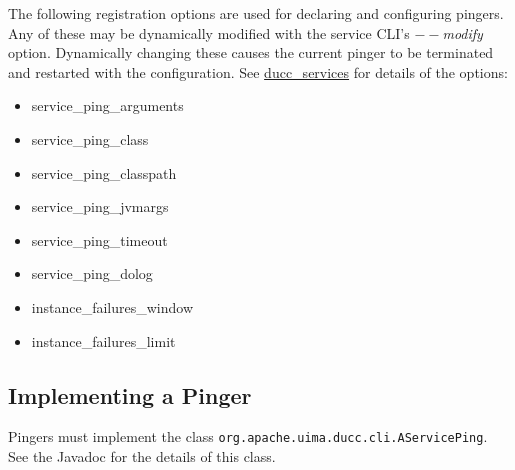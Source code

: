       The following registration options are used for declaring and configuring pingers.  Any of these
      may be dynamically modified with the service CLI's {\em$--$modify} option.  Dynamically changing
      these causes the current pinger to be terminated and restarted with the configuration.  See
      \hyperref[sec:cli.ducc-services]{ducc\_services} for details of the options:
      \begin{itemize}
        \item service\_ping\_arguments
        \item service\_ping\_class
        \item service\_ping\_classpath
        \item service\_ping\_jvmargs
        \item service\_ping\_timeout
        \item service\_ping\_dolog
        \item instance\_failures\_window
        \item instance\_failures\_limit
      \end{itemize}

      
      \subsection{Implementing a Pinger}
      Pingers must implement the class {\tt org.apache.uima.ducc.cli.AServicePing}.  See the
      Javadoc for the details of this class.

